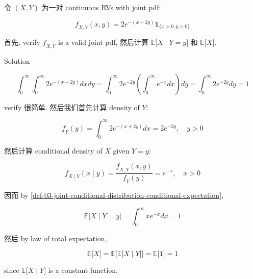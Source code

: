 \begin{example}

令 \((\mathit{X},\mathit{Y})\) 为一对 continuous RVs with joint pdf:

\[\mathit{f}_{\mathit{X},\mathit{Y}}(\mathit{x},\mathit{y}) = 2\mathit{e}^{- (\mathit{x} + 2\mathit{y})}\mathbf{1}_{\{{\mathit{x} > 0,\mathit{y} > 0}\}}\]

首先, verify \(\mathit{f}_{\mathit{X},\mathit{Y}}\) is a valid joint pdf, 然后计算 \(\left. \mathbb{E}\lbrack\mathit{X} \middle| \mathit{Y} = \mathit{y}\rbrack \right.\) 和 \(\mathbb{E}\lbrack\mathit{X}\rbrack\).

\end{example}

\begin{qlsolution}{Solution}

\[\int_{0}^{\infty}\int_{0}^{\infty}2\mathit{e}^{- (\mathit{x} + 2\mathit{y})}\mathit{d}\mathit{x}\mathit{d}\mathit{y} = \int_{0}^{\infty}2\mathit{e}^{- 2\mathit{y}}\left( {\int_{0}^{\infty}\mathit{e}^{- \mathit{x}}\mathit{d}\mathit{x}} \right)\mathit{d}\mathit{y} = \int_{0}^{\infty}2\mathit{e}^{- 2\mathit{y}}\mathit{d}\mathit{y} = 1\]

verify 很简单. 然后我们首先计算 density of \(\mathit{Y}\):

\[\mathit{f}_{\mathit{Y}}(\mathit{y}) = \int_{0}^{\infty}2\mathit{e}^{- (\mathit{x} + 2\mathit{y})}\mathit{d}\mathit{x} = 2\mathit{e}^{- 2\mathit{y}},\quad\mathit{y} > 0\]

然后计算 conditional density of \(\mathit{X}\) given \(\mathit{Y} = \mathit{y}\):

\[\mathit{f}_{\mathit{X} \mid \mathit{Y}}(\mathit{x} \mid \mathit{y}) = \frac{\mathit{f}_{\mathit{X},\mathit{Y}}(\mathit{x},\mathit{y})}{\mathit{f}_{\mathit{Y}}(\mathit{y})} = \mathit{e}^{- \mathit{x}},\quad\mathit{x} > 0\]

因而 by \ref{def-03-joint-conditional-distribution-conditional-expectation},

\[\mathbb{E}\lbrack\mathit{X} \mid \mathit{Y} = \mathit{y}\rbrack = \int_{0}^{\infty}\mathit{x}\mathit{e}^{- \mathit{x}}\mathit{d}\mathit{x} = 1\]

然后 by law of total expectation,

\[\left. \mathbb{E}\lbrack\mathit{X}\rbrack = \mathbb{E}\lbrack\mathbb{E}\lbrack\mathit{X} \middle| \mathit{Y}\rbrack\rbrack = \mathbb{E}\lbrack 1\rbrack = 1 \right.\]

since \(\left. \mathbb{E}\lbrack\mathit{X} \middle| \mathit{Y}\rbrack \right.\) is a constant function.

\end{qlsolution}
